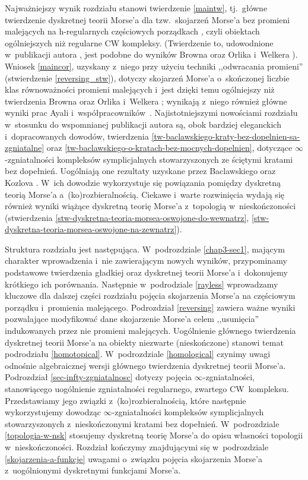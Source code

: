 Najważniejszy wynik rozdziału stanowi twierdzenie \ref{maintw}, tj.~główne twierdzenie dyskretnej teorii Morse'a dla tzw.~skojarzeń Morse'a bez promieni malejących na \mbox{h-regularnych} częściowych porządkach \cite{Minian12}, czyli obiektach ogólniejszych niż regularne CW kompleksy. (Twierdzenie to, udowodnione w~publikacji autora \cite{Kukiela13}, jest podobne do wyników Browna \cite[Proposition 1]{Brown92} oraz Orlika i~Welkera \cite[Theorem 4.2.14]{Orlik07}). Wniosek \ref{maincor}, uzyskany z~niego przy użyciu techniki ,,odwracania promieni'' (stwierdzenie \ref{reversing_stw}), dotyczy skojarzeń Morse'a o~skończonej liczbie klas równoważności promieni malejących i~jest dzięki temu ogólniejszy niż twierdzenia Browna \cite{Brown92} oraz Orlika i~Welkera \cite{Orlik07}; wynikają z~niego również główne wyniki prac \mbox{Ayali} i~współpracowników~\cite{Ayala07,Ayala09}. Najistotniejszymi nowościami rozdziału w~stosunku do wspomnianej publikacji autora \cite{Kukiela13} są, obok bardziej eleganckich i~dopracowanych dowodów, twierdzenia \ref{tw-baclawskiego-kraty-bez-dopelnien-sa-zgniatalne} oraz \ref{tw-baclawskiego-o-kratach-bez-mocnych-dopelnien}, dotyczące \mbox{$\infty$-zgniatalności} kompleksów symplicjalnych stowarzyszonych ze ściętymi kratami bez dopełnień. Uogólniają one rezultaty uzyskane przez Baclawskiego \cite{Baclawski12} oraz Kozlova \cite{Kozlov98}. W~ich dowodzie wykorzystuje się powiązania pomiędzy dyskretną teorią Morse'a a~(ko)rozbieralnością. Ciekawe i~warte rozwinięcia wydają się również wyniki wiążące dyskretną teorię Morse'a z~topologią w~nieskończoności (stwierdzenia \ref{stw-dyskretna-teoria-morsea-oswojone-do-wewnatrz}, \ref{stw-dyskretna-teoria-morsea-oswojone-na-zewnatrz}).

Struktura rozdziału jest następująca. W~podrozdziale \ref{chap3-sec1}, mającym charakter wprowadzenia i~nie zawierającym nowych wyników, przypominamy podstawowe twierdzenia gładkiej oraz dyskretnej teorii Morse'a i~dokonujemy krótkiego ich porównania. Następnie w~podrodziale \ref{rayless} wprowadzamy kluczowe dla dalszej części rozdziału pojęcia skojarzenia Morse'a na częściowym porządku i~promienia malejącego. Podrozdział \ref{reversing} zawiera ważne wyniki pozwalające modyfikować dane skojarzenie Morse'a celem ,,usunięcia'' indukowanych przez nie promieni malejących. Uogólnienie głównego twierdzenia dyskretnej teorii Morse'a na obiekty niezwarte (nieskończone) stanowi temat podrodziału \ref{homotopical}. W~podrozdziale \ref{homological} czynimy uwagi odnośnie algebraicznej wersji głównego twierdzenia dyskretnej teorii Morse'a. Podrozdział \ref{sec-infty-zgniatalnosc} dotyczy pojęcia $\infty$-zgniatalności, stanowiącego uogólnienie zgniatalności regularnego, zwartego CW~kompleksu. Przedstawiamy jego związki z~(ko)rozbieralnością, które następnie wykorzystujemy dowodząc $\infty$-zgniatalności kompleksów symplicjalnych stowarzyszonych z~nieskończonymi kratami bez dopełnień. W~podrozdziale \ref{topologia-w-nsk} stosujemy dyskretną teorię Morse'a do opisu własności topologii w~nieskończoności. Rozdział kończymy znajdującymi się w~podrozdziale \ref{skojarzenia-a-funkcje} uwagami o~związku pojęcia skojarzenia Morse'a z~uogólnionymi dyskretnymi funkcjami Morse'a.

